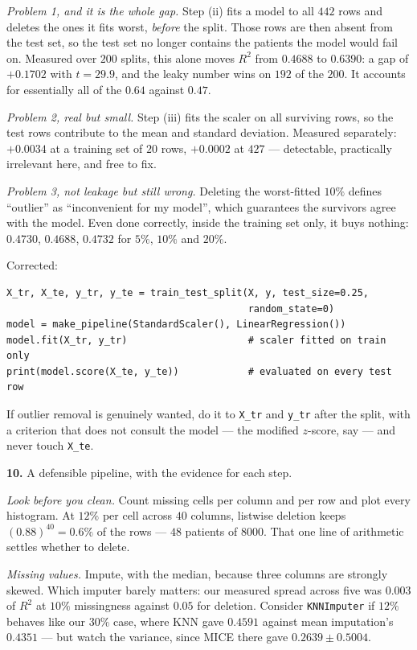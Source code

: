 \documentclass[11pt]{article}
\begin{document}
\emph{Problem 1, and it is the whole gap.} Step (ii) fits a model to all $442$
rows and deletes the ones it fits worst, \emph{before} the split. Those rows are
then absent from the test set, so the test set no longer contains the patients
the model would fail on. Measured over $200$ splits, this alone moves $R^2$
from $0.4688$ to $0.6390$: a gap of $+0.1702$ with $t = 29.9$, and the leaky
number wins on $192$ of the $200$. It accounts for essentially all of the
$0.64$ against $0.47$.

\emph{Problem 2, real but small.} Step (iii) fits the scaler on all surviving
rows, so the test rows contribute to the mean and standard deviation. Measured
separately: $+0.0034$ at a training set of $20$ rows, $+0.0002$ at $427$ ---
detectable, practically irrelevant here, and free to fix.

\emph{Problem 3, not leakage but still wrong.} Deleting the worst-fitted
$10\%$ defines ``outlier'' as ``inconvenient for my model'', which guarantees
the survivors agree with the model. Even done correctly, inside the training
set only, it buys nothing: $0.4730$, $0.4688$, $0.4732$ for $5\%$, $10\%$ and
$20\%$.

Corrected:

\begin{lstlisting}
X_tr, X_te, y_tr, y_te = train_test_split(X, y, test_size=0.25,
                                          random_state=0)
model = make_pipeline(StandardScaler(), LinearRegression())
model.fit(X_tr, y_tr)                     # scaler fitted on train only
print(model.score(X_te, y_te))            # evaluated on every test row
\end{lstlisting}

If outlier removal is genuinely wanted, do it to \texttt{X\_tr} and
\texttt{y\_tr} after the split, with a criterion that does not consult the
model --- the modified $z$-score, say --- and never touch \texttt{X\_te}.

\medskip
\textbf{10.} A defensible pipeline, with the evidence for each step.

\emph{Look before you clean.} Count missing cells per column and per row and
plot every histogram. At $12\%$ per cell across $40$ columns, listwise deletion
keeps $(0.88)^{40} = 0.6\%$ of the rows --- $48$ patients of $8000$. That one
line of arithmetic settles whether to delete.

\emph{Missing values.} Impute, with the median, because three columns are
strongly skewed. Which imputer barely matters: our measured spread across five
was $0.003$ of $R^2$ at $10\%$ missingness against $0.05$ for deletion.
Consider \texttt{KNNImputer} if $12\%$ behaves like our $30\%$ case, where KNN
gave $0.4591$ against mean imputation's $0.4351$ --- but watch the variance,
since MICE there gave $0.2639 \pm 0.5004$.
\end{document}
